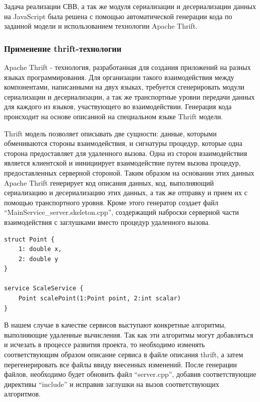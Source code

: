 \documentclass[12pt, a4paper]{article}
\begin{document}
Задача реализации СВВ, а так же модуля сериализации и десериализации данных на
JavaScript была решена с помощью автоматической генерации кода по заданной
модели и использованием технологии Apache Thrift.

\subsubsection{Применение thrift-технологии}
Apache Thrift - технология, разработанная для создания приложений на
разных языках программирования. Для организации такого взаимодействия между
компонентами, написанными на двух языках, требуется сгенерировать модули
сериализации и десериализации, а так же транспортные уровни передачи
данных для каждого из языков, участвующего во взаимодействии. Генерация кода
происходит на основе описанной на специальном языке Thrift модели.

Thrift модель позволяет описывать две сущности: данные, которыми обмениваются
стороны взаимодействия, и сигнатуры процедур, которые одна сторона
предоставляет для удаленного вызова. Одна из сторон взаимодействия является
клиентской и иинициирует взаимодействие путем вызова процедур, предоставленных
серверной стороной. Таким образом на основании этих данных Apache Thrift
генерирует код описания данных, код, выполняющий сериализацию и десериализацию
этих данных, а так же отправку и прием их с помощью транспортного уровня. Кроме этого
генератор создает файл ``MainService\_server.skeleton.cpp'', создержащий наброски
серверной части взаимодействия с заглушками вместо процедур удаленного вызова.
\begin{lstlisting}[caption={Пример описания модели и сервиса для технологии
Thrift}]
struct Point {
    1: double x,
    2: double y
}

service ScaleService {
    Point scalePoint(1:Point point, 2:int scalar)
}
\end{lstlisting}

В нашем случае в качестве сервисов выступают конкретные алгоритмы, выполняющие
удаленные вычисления. Так как эти алгоритмы могут добавляться и исчезать в
процессе развития проекта, то необходимо изменять соответствующим образом
описание сервиса в файле описания thrift, а затем перегенерировать все файлы
ввиду внесенных изменений. После генерации файлов, необходимо будет обновить
файл ``server.cpp'', добавив соответствующие директивы ``include'' и исправив
заглушки на вызов соответствующих алгоритмов.
\end{document}
